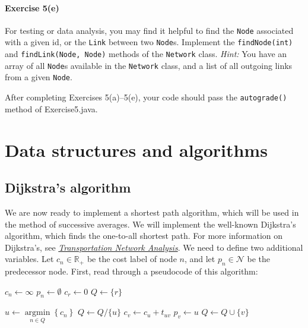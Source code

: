 \documentclass[12pt]{article}
\newcommand{\N}{\mathcal{N}}
\newcommand{\A}{\mathcal{A}}
\DeclareMathOperator*{\argmin}{\arg\min}
\begin{document}
\paragraph*{Exercise 5(e)} For testing or data analysis, you may find it helpful to find the \texttt{Node} associated with a given id, or the \texttt{Link} between two \texttt{Node}s. Implement the \texttt{findNode(int)} and \texttt{findLink(Node, Node)} methods of the \texttt{Network} class. \textit{Hint:} You have an array of all \texttt{Node}s available in the \texttt{Network} class, and a list of all outgoing links from a given \texttt{Node}. 


 \vspace{\baselineskip}


\noindent
After completing Exercises 5(a)--5(e), your code should pass the \texttt{autograde()} method of Exercise5.java. 




\section{Data structures and algorithms}


\subsection{Dijkstra's algorithm}


We are now ready to implement a shortest path algorithm, which will be used in the method of successive averages. We will implement the well-known Dijkstra's algorithm, which finds the one-to-all shortest path. For more information on Dijkstra's, see \href{https://sboyles.github.io/blubook.html}{\textit{Transportation Network Analysis}}. We need to define two additional variables. Let $c_n\in\mathbb{R}_+$ be the cost label of node $n$, and let $p_n\in\N$ be the predecessor node. First, read through a pseudocode of this algorithm:


\vspace{\baselineskip}


\begin{algorithmic}[1]
	\For{$n\in \N$}  \label{line1}
	\State $c_n \leftarrow \infty$
	\State $p_n \leftarrow \emptyset$
	\EndFor
	\State $c_r \leftarrow 0$ \label{line6}
	\State  $Q\leftarrow \{r\}$ \label{line7}
	
	\vspace{0.5\baselineskip}
	
	  \label{line8}
	\State $u\leftarrow \argmin\limits_{n\in Q} \left\{ c_n\right\}$ \label{line9}
	\State $Q\leftarrow Q/\{u\}$
	\For{$(u,v)\in\A$} \label{line10}
	  \label{line11}
	\State $c_v \leftarrow c_u + t_{uv}$  \label{line12}
	\State $p_v \leftarrow u$
	\State $Q\leftarrow Q\cup \{v\}$ \label{line14}
	\EndIf
	\EndFor
	\EndWhile \label{line17}
	\EndProcedure 
	
\end{algorithmic}
\end{document}
